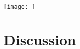 \documentclass{article}
\begin{document}
\begin{figure*}
\texttt{[image: ]}
\caption{}
\end{figure*}

\section{Discussion}


\nocite{*}





\appendix
\end{document}
